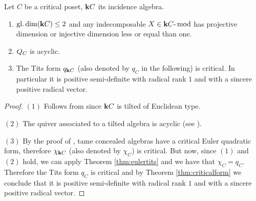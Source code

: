 \begin{theorem}\label{thm:titscritical}
	Let $C$ be a critical poset, $\mathbf{k}{C}$ its incidence algebra.
	\begin{enumerate}
		\item[$(1)$] $\operatorname{gl.dim}(\mathbf{k}{C})\leq 2$ and any indecomposable $X\in \mathbf{k}{C}\text{-}\operatorname{mod}$ has projective dimension or injective dimension less or equal than one.
		
		\item[$(2)$] $Q_{C}$ is acyclic.
		
		\item[$(3)$] The Tits form $q_{\mathbf{k}{C}}$ (also denoted by $q_C$ in the following) is critical. In particular it is positive semi-definite with radical rank $1$ and with a sincere positive radical vector.
	\end{enumerate} 
\end{theorem}
\begin{proof}
	$(1)$ Follows from \cite[Ch.VIII, Lemma 3.2]{sim:vol1} since $\mathbf{k}{C}$ is tilted of Euclidean type.
	
	$(2)$ The quiver associated to a tilted algebra is acyclic (see \cite[Ch.VIII, Corollary 3.4]{sim:vol1}).
	
	$(3)$ By the proof of \cite[Proposition 4.3.7]{ringel2006tame}, tame concealed algebras have a critical Euler quadratic form, therefore $\chi_{\mathbf{k}{C}}$ (also denoted by $\chi_C$) is critical. But now, since $(1)$ and $(2)$ hold, we can apply Theorem \ref{thm:eulertits} and we have that $\chi_C=q_C$. Therefore the Tits form $q_C$ is critical and by Theorem \ref{thm:criticalform} we conclude that it is positive semi-definite with radical rank $1$ and with a sincere positive radical vector.
\end{proof}







